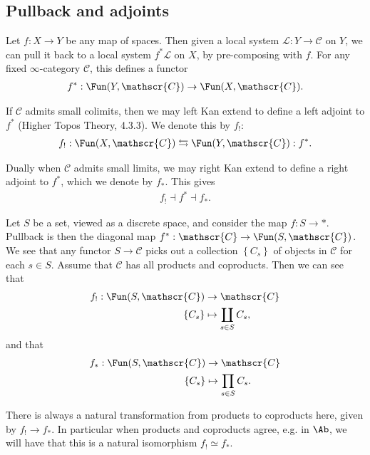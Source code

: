 
\subsection{Pullback and adjoints}

Let $f: X \to Y$ be any map of spaces. Then given a local system $\mathcal{L}: Y \to \mathscr{C}$ on $Y$, we can pull it back to a local system $f^\ast \mathcal{L}$ on $X$, by pre-composing with $f$. For any fixed $\infty$-category $\mathscr{C}$, this defines a functor
\begin{align*}
    f^\ast : \Fun(Y, \mathscr{C}) \to \Fun(X, \mathscr{C}).
\end{align*}

If $\mathscr{C}$ admits small colimits, then we may left Kan extend to define a left adjoint to $f^\ast$ (Higher Topos Theory, 4.3.3). We denote this by $f_!$:
\begin{align*}
    f_! : \Fun(X, \mathscr{C}) \leftrightarrows \Fun(Y, \mathscr{C}) : f^\ast.
\end{align*}

Dually when $\mathscr{C}$ admits small limits, we may right Kan extend to define a right adjoint to $f^\ast$, which we denote by $f_\ast$. This gives
\begin{align*}
    f_! \dashv f^\ast \dashv f_\ast.
\end{align*}

\begin{example} Let $S$ be a set, viewed as a discrete space, and consider the map $f: S \to \ast$. Pullback is then the diagonal map $f^\ast : \mathscr{C} \to \Fun(S, \mathscr{C})$. We see that any functor $S \to \mathscr{C}$ picks out a collection $\left\{ C_s \right\}$ of objects in $\mathscr{C}$ for each $s\in S$. Assume that $\mathscr{C}$ has all products and coproducts. Then we can see that
\begin{align*}
    f_!: \Fun(S, \mathscr{C}) &\to \mathscr{C} \\
    \left\{ C_s \right\} &\mapsto \coprod_{s\in S} C_s,
\end{align*}
and that
\begin{align*}
    f_\ast : \Fun(S, \mathscr{C}) &\to \mathscr{C} \\
    \left\{ C_s \right\} &\mapsto \prod_{s\in S} C_s.
\end{align*}

There is always a natural transformation from products to coproducts here, given by $f_! \to f_\ast$. In particular when products and coproducts agree, e.g. in $\Ab$, we will have that this is a natural isomorphism $f_! \simeq f_\ast$.
\end{example}

